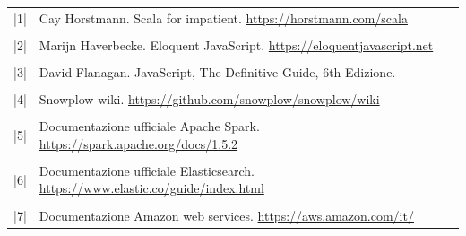 \documentclass[a4paper, 12pt, twoside, openright]{book}
\begin{document}
\begin{tabular}{ m{2em} m{28em} }
|1| & Cay Horstmann. Scala for impatient. \url{https://horstmann.com/scala}\\
	& \\
|2| & Marijn Haverbecke. Eloquent JavaScript. \url{https://eloquentjavascript.net}\\
	& \\
|3| & David Flanagan. JavaScript, The Definitive Guide, 6th Edizione.\\
	& \\
|4| & Snowplow wiki. \url{https://github.com/snowplow/snowplow/wiki} \\
    & \\
|5| & Documentazione ufficiale Apache Spark. \url{https://spark.apache.org/docs/1.5.2}\\
	& \\
|6| & Documentazione ufficiale Elasticsearch. \url{https://www.elastic.co/guide/index.html}\\
	& \\
|7| & Documentazione Amazon web services. \url{https://aws.amazon.com/it/}
\end{tabular}
\end{document}
